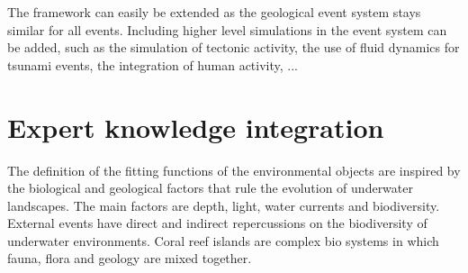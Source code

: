 The framework can easily be extended as the geological event system stays similar for all events. Including higher level simulations in the event system can be added, such as the simulation of tectonic activity, the use of fluid dynamics for tsunami events, the integration of human activity, ...

\section{Expert knowledge integration}
\label{sec:env-obj_biology}
  The definition of the fitting functions of the environmental objects are inspired by the biological and geological factors that rule the evolution of underwater landscapes. The main factors are depth, light, water currents and biodiversity. External events have direct and indirect repercussions on the biodiversity of underwater environments. Coral reef islands are complex bio systems in which fauna, flora and geology are mixed together. 

